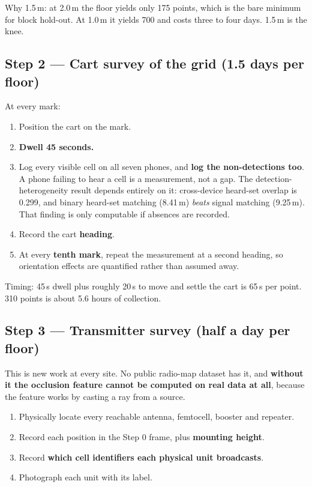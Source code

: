\documentclass[11pt,a4paper]{article}
\newcommand{\B}[1]{\textcolor{bad}{\textbf{#1}}}
\begin{document}
Why 1.5\,m: at 2.0\,m the floor yields only 175 points, which is the bare minimum for
block hold-out. At 1.0\,m it yields 700 and costs three to four days. 1.5\,m is the knee.

\subsection{Step 2 --- Cart survey of the grid (1.5 days per floor)}

At every mark:

\begin{enumerate}
\item Position the cart on the mark.
\item \textbf{Dwell 45 seconds.}
\item Log every visible cell on all seven phones, and \B{log the non-detections too}.
A phone failing to hear a cell is a measurement, not a gap. The detection-heterogeneity
result depends entirely on it: cross-device heard-set overlap is 0.299, and binary
heard-set matching (8.41\,m) \emph{beats} signal matching (9.25\,m). That finding is only
computable if absences are recorded.
\item Record the cart \textbf{heading}.
\item At every \textbf{tenth mark}, repeat the measurement at a second heading, so
orientation effects are quantified rather than assumed away.
\end{enumerate}

Timing: 45\,s dwell plus roughly 20\,s to move and settle the cart is 65\,s per point.
310 points is about 5.6 hours of collection.

\subsection{Step 3 --- Transmitter survey (half a day per floor)}

This is new work at every site. No public radio-map dataset has it, and \textbf{without it
the occlusion feature cannot be computed on real data at all}, because the feature works
by casting a ray from a source.

\begin{enumerate}
\item Physically locate every reachable antenna, femtocell, booster and repeater.
\item Record each position in the Step 0 frame, plus \textbf{mounting height}.
\item Record \textbf{which cell identifiers each physical unit broadcasts}.
\item Photograph each unit with its label.
\end{enumerate}
\end{document}
